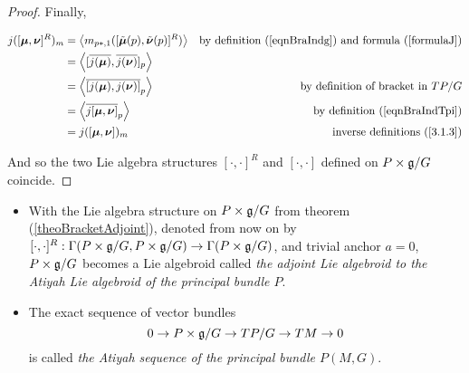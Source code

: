 \begin{proof}
Finally,

\begin{align*}
    j([\bm{\mu}, \bm{\nu}]^R)_m 
    &= \left\langle m_{p*, 1} ([\tilde{\bm{\mu}}(p), \tilde{\bm{\nu}}(p)]^R) \right\rangle & \textrm{by definition (\ref{eqnBraIndg}) and formula (\ref{formulaJ})} \\ 
    &= \left\langle [\overline{j(\bm{\mu})}, \overline{j(\bm{\nu})}]_p \right\rangle\\
    &= \left\langle \overline{[j(\bm{\mu}), j(\bm{\nu})]}_p \right\rangle & \textrm{by definition of bracket in $TP/G$}\\
    &= \left\langle \overline{j[\bm{\mu}, \bm{\nu}]}_p \right\rangle & \textrm{by definition (\ref{eqnBraIndTpi})} \\
    &= j([\bm{\mu}, \bm{\nu}])_m & \textrm{inverse definitions (\ref{3.1.3})}
\end{align*}

And so the two Lie algebra structures $[\cdot, \cdot]^R$ and $[\cdot, \cdot]$ defined on $P \times \mathfrak{g}/G$ coincide.

\end{proof}

\begin{definition}\label{AtiyahSeq}
    \begin{itemize}
    
    \item With the Lie algebra structure on $P \times \mathfrak{g}/G$ from theorem (\ref{theoBracketAdjoint}), denoted from now on by $[\cdot, \cdot]^R: \Gamma(P \times \mathfrak{g}/G, P \times \mathfrak{g}/G) \to \Gamma(P \times \mathfrak{g}/G)$, and trivial anchor $a=0$, $P \times \mathfrak{g}/G$ becomes a Lie algebroid called \emph{the adjoint Lie algebroid to the Atiyah Lie algebroid of the principal bundle $P$}.
    
    \item The exact sequence of vector bundles
\begin{equation} \label{AtiyahSequence}
    0 \to P \times \mathfrak{g}/G \to TP/G \to TM \to 0
\end{equation}
is called \emph{the Atiyah sequence of the principal bundle $P(M, G)$}.
    
    \end{itemize}


\end{definition}


